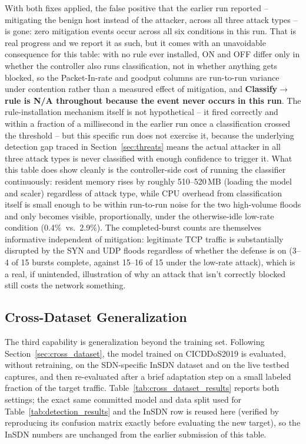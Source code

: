 \documentclass[ASNA,twocolumn]{USG} %
\begin{document}
With both fixes applied, the false positive that the earlier run reported -- mitigating the benign host instead of the attacker, across all three attack types -- is gone: zero mitigation events occur across all six conditions in this run. That is real progress and we report it as such, but it comes with an unavoidable consequence for this table: with no rule ever installed, ON and OFF differ only in whether the controller also runs classification, not in whether anything gets blocked, so the Packet-In-rate and goodput columns are run-to-run variance under contention rather than a measured effect of mitigation, and \textbf{Classify$\to$rule is N/A throughout because the event never occurs in this run}. The rule-installation mechanism itself is not hypothetical -- it fired correctly and within a fraction of a millisecond in the earlier run once a classification crossed the threshold -- but this specific run does not exercise it, because the underlying detection gap traced in Section~\ref{sec:threats} means the actual attacker in all three attack types is never classified with enough confidence to trigger it. What this table does show cleanly is the controller-side cost of running the classifier continuously: resident memory rises by roughly 510--520\,MB (loading the model and scaler) regardless of attack type, while CPU overhead from classification itself is small enough to be within run-to-run noise for the two high-volume floods and only becomes visible, proportionally, under the otherwise-idle low-rate condition (0.4\%\ vs.\ 2.9\%). The completed-burst counts are themselves informative independent of mitigation: legitimate TCP traffic is substantially disrupted by the SYN and UDP floods regardless of whether the defense is on (3--4 of 15 bursts complete, against 15--16 of 15 under the low-rate attack), which is a real, if unintended, illustration of why an attack that isn't correctly blocked still costs the network something.

\subsection{Cross-Dataset Generalization}
\label{sec:cross_dataset_results}

The third capability is generalization beyond the training set. Following Section~\ref{sec:cross_dataset}, the model trained on CICDDoS2019 is evaluated, without retraining, on the SDN-specific InSDN dataset \cite{elsayed2020insdn} and on the live testbed captures, and then re-evaluated after a brief adaptation step on a small labeled fraction of the target traffic. Table~\ref{tab:cross_dataset_results} reports both settings; the exact same committed model and data split used for Table~\ref{tab:detection_results} and the InSDN row is reused here (verified by reproducing its confusion matrix exactly before evaluating the new target), so the InSDN numbers are unchanged from the earlier submission of this table.
\end{document}

